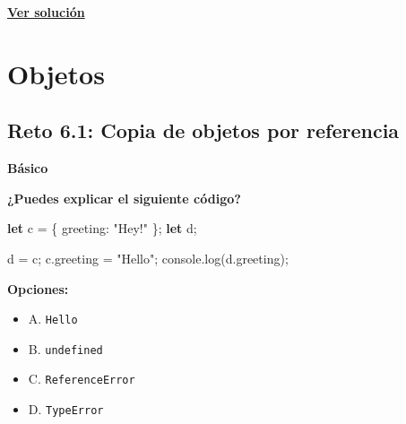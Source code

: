 \documentclass[
  letterpaper,
  DIV=11,
  numbers=noendperiod]{scrreprt}
\newenvironment{Shaded}{\begin{snugshade}}{\end{snugshade}}
\newcommand{\AttributeTok}[1]{\textcolor[rgb]{0.40,0.45,0.13}{#1}}
\newcommand{\BuiltInTok}[1]{\textcolor[rgb]{0.00,0.23,0.31}{#1}}
\newcommand{\DataTypeTok}[1]{\textcolor[rgb]{0.68,0.00,0.00}{#1}}
\newcommand{\FunctionTok}[1]{\textcolor[rgb]{0.28,0.35,0.67}{#1}}
\newcommand{\KeywordTok}[1]{\textcolor[rgb]{0.00,0.23,0.31}{\textbf{#1}}}
\newcommand{\NormalTok}[1]{\textcolor[rgb]{0.00,0.23,0.31}{#1}}
\newcommand{\OperatorTok}[1]{\textcolor[rgb]{0.37,0.37,0.37}{#1}}
\newcommand{\StringTok}[1]{\textcolor[rgb]{0.13,0.47,0.30}{#1}}
\providecommand{\tightlist}{%
  \setlength{\itemsep}{0pt}\setlength{\parskip}{0pt}}
\begin{document}
\textbf{\hyperref[sec-sol-cap5-reto21]{Ver solución}}

\chapter{Objetos}\label{objetos}

\section{Reto 6.1: Copia de objetos por
referencia}\label{sec-cap6-reto1}

\begin{tcolorbox}[enhanced jigsaw, left=2mm, toprule=.15mm, leftrule=.75mm, breakable, colback=white, coltitle=black, bottomtitle=1mm, arc=.35mm, rightrule=.15mm, colframe=quarto-callout-caution-color-frame, opacitybacktitle=0.6, toptitle=1mm, opacityback=0, titlerule=0mm, title=\textcolor{quarto-callout-caution-color}{\faFire}\hspace{0.5em}{Dificultad}, bottomrule=.15mm, colbacktitle=quarto-callout-caution-color!10!white]

\textbf{Básico}

\end{tcolorbox}

\textbf{¿Puedes explicar el siguiente código?}

\begin{Shaded}
\begin{Highlighting}[]
\KeywordTok{let}\NormalTok{ c }\OperatorTok{=}\NormalTok{ \{ }\DataTypeTok{greeting}\OperatorTok{:} \StringTok{"Hey!"}\NormalTok{ \}}\OperatorTok{;}
\KeywordTok{let}\NormalTok{ d}\OperatorTok{;}

\NormalTok{d }\OperatorTok{=}\NormalTok{ c}\OperatorTok{;}
\NormalTok{c}\OperatorTok{.}\AttributeTok{greeting} \OperatorTok{=} \StringTok{"Hello"}\OperatorTok{;}
\BuiltInTok{console}\OperatorTok{.}\FunctionTok{log}\NormalTok{(d}\OperatorTok{.}\AttributeTok{greeting}\NormalTok{)}\OperatorTok{;}
\end{Highlighting}
\end{Shaded}

\textbf{Opciones:}

\begin{itemize}
\tightlist
\item
  A. \texttt{Hello}
\item
  B. \texttt{undefined}
\item
  C. \texttt{ReferenceError}
\item
  D. \texttt{TypeError}
\end{itemize}
\end{document}
